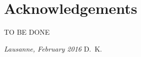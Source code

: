\chapter*{Acknowledgements}
TO BE DONE

\bigskip
 
\noindent\textit{Lausanne, February 2016}
\hfill D.~K.

